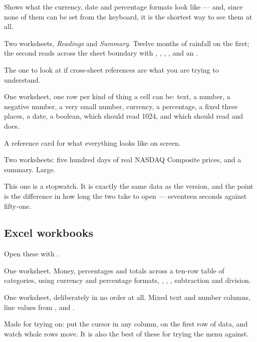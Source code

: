 Shows what the currency, date and percentage formats look like --- and, since
none of them can be set from the keyboard, it is the shortest way to see them
at all.


Two worksheets, \emph{Readings} and \emph{Summary}. Twelve months of rainfall
on the first; the second reads across the sheet boundary with
, , , ,  and
an .

The one to look at if cross-sheet references are what you are trying to
understand.


One worksheet, one row per kind of thing a cell can be: text, a number, a
negative number, a very small number, currency, a percentage, a fixed three
places, a date, a boolean,  which should read 1024, and
 which should read  and does.

A reference card for what everything looks like on screen.


Two worksheets: five hundred days of real NASDAQ Composite prices, and a
summary. Large.

This one is a stopwatch. It is exactly the same data as the 
version, and the point is the difference in how long the two take to open ---
seventeen seconds against fifty-one.

\subsection{Excel workbooks}

Open these with .


One worksheet. Money, percentages and totals across a ten-row table of
categories, using currency and percentage formats, , ,
, subtraction and division.


One worksheet, deliberately in no order at all. Mixed text and number columns,
line values from ,  and .

Made for trying  on: put the cursor in any column, on
the first row of data, and watch whole rows move. It is also the best of these
for trying the  menu against.

